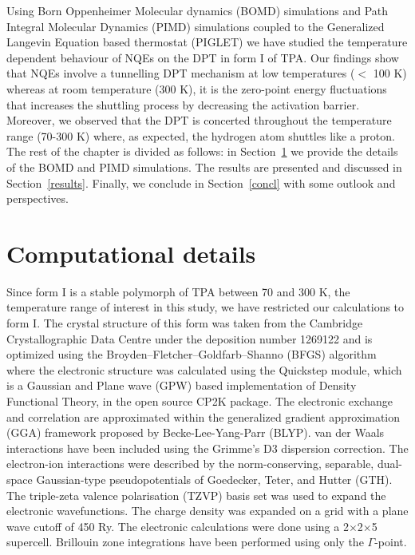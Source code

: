 Using Born Oppenheimer Molecular dynamics (BOMD) simulations and Path Integral Molecular Dynamics (PIMD) simulations coupled to the Generalized Langevin Equation based thermostat (PIGLET) we have studied the temperature dependent behaviour of NQEs on the DPT in form I of TPA. Our findings show that NQEs involve a tunnelling DPT mechanism at low temperatures ($<$ 100 K) whereas at room temperature (300 K), it is the zero-point energy fluctuations that increases the shuttling process by decreasing the activation barrier. Moreover, we observed that the DPT is concerted throughout the temperature range (70-300 K) where, as expected, the hydrogen atom shuttles like a proton. The rest of the chapter is divided as follows: in Section~\ref{compdet} we provide the details of the BOMD and PIMD simulations. The results are presented and discussed in Section~\ref{results}. Finally, we conclude in Section~\ref{concl} with some outlook and perspectives.


\section{Computational details}
\label{compdet}

Since form I is a stable polymorph of TPA between 70 and
300 K,\cite{sledz2001new, bailey1967crystal} the
temperature range of interest in this study, we have restricted our calculations
to form I. The crystal structure of this form was taken from the Cambridge 
Crystallographic Data Centre under the deposition number 1269122 and is optimized 
using the Broyden–Fletcher–Goldfarb–Shanno\cite{fletcher2013practical} (BFGS) algorithm where the electronic structure was calculated using the
Quickstep\cite{vandevondele2005quickstep} module, which is a Gaussian and Plane 
wave (GPW) based implementation of Density Functional Theory, in the open source 
CP2K\cite{hutter2014cp2k} package. The electronic exchange and correlation are
approximated within the generalized gradient approximation (GGA) framework proposed by 
Becke-Lee-Yang-Parr\cite{becke1988density,lee1988development} (BLYP). van der Waals 
interactions have been included using the Grimme's D3 
dispersion correction\cite{grimme2010consistent}. The electron-ion  
interactions were described by the norm-conserving, separable, dual-space 
Gaussian-type pseudopotentials of Goedecker, Teter, and 
Hutter\cite{goedecker1996separable} (GTH). The triple-zeta valence polarisation
(TZVP) basis set was used to expand the electronic wavefunctions. The 
charge density was expanded on a grid with a plane wave cutoff of 450 Ry. The 
electronic calculations were done using a 2$\times$2$\times$5 supercell. Brillouin zone integrations have been performed using only the $\Gamma$-point.

